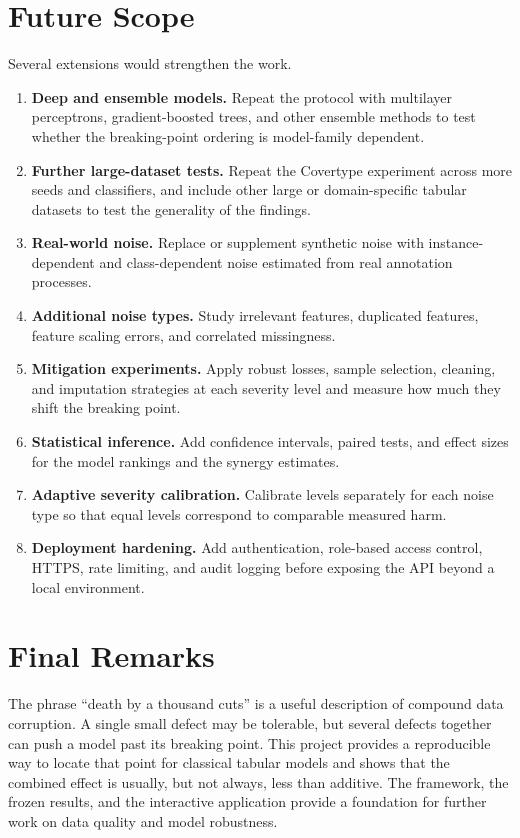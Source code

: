 \section{Future Scope}

Several extensions would strengthen the work.

\begin{enumerate}
  \item \textbf{Deep and ensemble models.} Repeat the protocol with multilayer perceptrons, gradient-boosted trees, and other ensemble methods to test whether the breaking-point ordering is model-family dependent.
  \item \textbf{Further large-dataset tests.} Repeat the Covertype experiment across more seeds and classifiers, and include other large or domain-specific tabular datasets to test the generality of the findings.
  \item \textbf{Real-world noise.} Replace or supplement synthetic noise with instance-dependent and class-dependent noise estimated from real annotation processes.
  \item \textbf{Additional noise types.} Study irrelevant features, duplicated features, feature scaling errors, and correlated missingness.
  \item \textbf{Mitigation experiments.} Apply robust losses, sample selection, cleaning, and imputation strategies at each severity level and measure how much they shift the breaking point.
  \item \textbf{Statistical inference.} Add confidence intervals, paired tests, and effect sizes for the model rankings and the synergy estimates.
  \item \textbf{Adaptive severity calibration.} Calibrate levels separately for each noise type so that equal levels correspond to comparable measured harm.
  \item \textbf{Deployment hardening.} Add authentication, role-based access control, HTTPS, rate limiting, and audit logging before exposing the API beyond a local environment.
\end{enumerate}

\section{Final Remarks}

The phrase ``death by a thousand cuts'' is a useful description of compound data corruption. A single small defect may be tolerable, but several defects together can push a model past its breaking point. This project provides a reproducible way to locate that point for classical tabular models and shows that the combined effect is usually, but not always, less than additive. The framework, the frozen results, and the interactive application provide a foundation for further work on data quality and model robustness.
